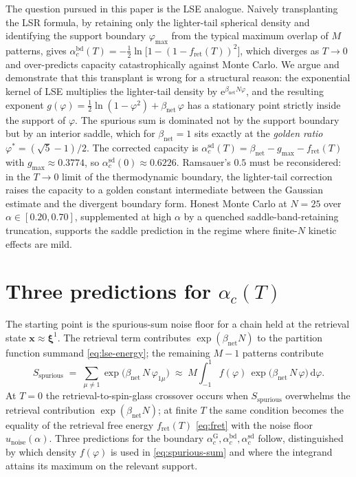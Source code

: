 \documentclass[11pt]{article}
\newcommand{\bxi}{\boldsymbol{\xi}}
\newcommand{\bx}{\bm{x}}
\newcommand{\e}{{\mathrm{e}}}
\newcommand{\dd}{{\mathrm{d}}}
\newcommand{\Bnet}{\beta_{\mathrm{net}}}
\newcommand{\fret}{f_{\mathrm{ret}}}
\newcommand{\acGauss}{\alpha_c^{\mathrm{G}}}
\newcommand{\acBd}{\alpha_c^{\mathrm{bd}}}
\newcommand{\acSd}{\alpha_c^{\mathrm{sd}}}
\begin{document}
The question pursued in this paper is the LSE analogue. Naively transplanting
the LSR formula, by retaining only the lighter-tail spherical density and
identifying the support boundary $\varphi_{\max}$ from the typical maximum
overlap of $M$ patterns, gives
$\acBd(T) = -\tfrac12\ln\bigl[1-(1-\fret(T))^2\bigr]$, which diverges as
$T\!\to\!0$ and over-predicts capacity catastrophically against Monte Carlo.
We argue and demonstrate that this transplant is wrong for a structural
reason: the exponential kernel of LSE multiplies the lighter-tail density by
$\e^{\Bnet N \varphi}$, and the resulting exponent
$g(\varphi) = \tfrac12 \ln(1-\varphi^2) + \Bnet\,\varphi$ has a stationary
point strictly inside the support of $\varphi$. The spurious sum is dominated
not by the support boundary but by an interior saddle, which for $\Bnet=1$
sits exactly at the \emph{golden ratio} $\varphi^* = (\sqrt{5}-1)/2$. The
corrected capacity is
$\acSd(T) = \Bnet - g_{\max} - \fret(T)$ with $g_{\max} \approx 0.3774$, so
$\acSd(0) \approx 0.6226$. Ramsauer's $0.5$ must be reconsidered: in the
$T\!\to\!0$ limit of the thermodynamic boundary, the lighter-tail correction
raises the capacity to a golden constant intermediate between the Gaussian
estimate and the divergent boundary form. Honest Monte Carlo at $N=25$ over
$\alpha\in[0.20,0.70]$, supplemented at high $\alpha$ by a quenched
saddle-band-retaining truncation, supports the saddle prediction in the
regime where finite-$N$ kinetic effects are mild.

\section{Three predictions for $\alpha_c(T)$}
\label{sec:formulas}

The starting point is the spurious-sum noise floor for a chain held at the
retrieval state $\bx\!\approx\!\bxi^1$. The retrieval term contributes
$\exp(\Bnet N)$ to the partition function summand
\eqref{eq:lse-energy}; the remaining $M-1$ patterns contribute
\begin{equation}
S_{\mathrm{spurious}} \;=\; \sum_{\mu\neq 1}
   \exp\!\bigl(\Bnet\,N\,\varphi_{1\mu}\bigr)
   \;\approx\; M \int_{-1}^{1} f(\varphi)\,
        \exp\!\bigl(\Bnet\,N\,\varphi\bigr)\,\dd\varphi.
\label{eq:spurious-sum}
\end{equation}
At $T=0$ the retrieval-to-spin-glass crossover occurs when
$S_{\mathrm{spurious}}$ overwhelms the retrieval contribution
$\exp(\Bnet N)$; at finite $T$ the same condition becomes the equality of
the retrieval free energy $\fret(T)$ \eqref{eq:fret} with the noise floor
$u_{\mathrm{noise}}(\alpha)$. Three predictions for the boundary
$\acGauss, \acBd, \acSd$ follow, distinguished by which density
$f(\varphi)$ is used in \eqref{eq:spurious-sum} and where the integrand
attains its maximum on the relevant support.
\end{document}
